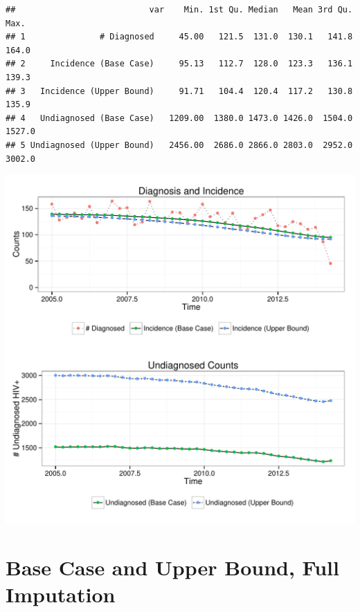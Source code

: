 \documentclass{article}\usepackage[]{graphicx}\usepackage[]{color}
\makeatletter
\def\maxwidth{ %
  \ifdim\Gin@nat@width>\linewidth
    \linewidth
  \else
    \Gin@nat@width
  \fi
}
\newenvironment{kframe}{%
 \def\at@end@of@kframe{}%
 \ifinner\ifhmode%
  \def\at@end@of@kframe{\end{minipage}}%
  \begin{minipage}{\columnwidth}%
 \fi\fi%
 \def\FrameCommand##1{\hskip\@totalleftmargin \hskip-\fboxsep
 \colorbox{shadecolor}{##1}\hskip-\fboxsep
     \hskip-\linewidth \hskip-\@totalleftmargin \hskip\columnwidth}%
 \MakeFramed {\advance\hsize-\width
   \@totalleftmargin\z@ \linewidth\hsize
   \@setminipage}}%
 {\par\unskip\endMakeFramed%
 \at@end@of@kframe}
\newenvironment{knitrout}{}{} %
\makeatother
\begin{document}
\begin{knitrout}\footnotesize
{}\color{fgcolor}\begin{kframe}
\begin{verbatim}
##                           var    Min. 1st Qu. Median   Mean 3rd Qu.   Max.
## 1               # Diagnosed     45.00   121.5  131.0  130.1   141.8  164.0
## 2     Incidence (Base Case)     95.13   112.7  128.0  123.3   136.1  139.3
## 3   Incidence (Upper Bound)     91.71   104.4  120.4  117.2   130.8  135.9
## 4   Undiagnosed (Base Case)   1209.00  1380.0 1473.0 1426.0  1504.0 1527.0
## 5 Undiagnosed (Upper Bound)   2456.00  2686.0 2866.0 2803.0  2952.0 3002.0
\end{verbatim}
\end{kframe}

{\centering \includegraphics[width=\maxwidth]{figure/minimal-noimpute} 

}



\end{knitrout}


\section{Base Case and Upper Bound, Full Imputation}
\end{document}
